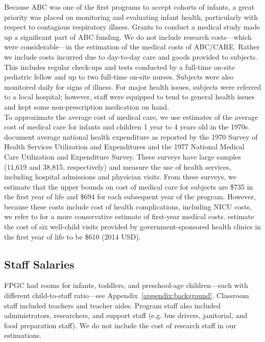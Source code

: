 \noindent Because ABC was one of the first programs to accept cohorts of infants, a great priority was placed on monitoring and evaluating infant health, particularly with respect to contagious respiratory illness. Grants to conduct a medical study made up a significant part of ABC funding. We do not include research costs---which were considerable---in the estimation of the medical costs of ABC/CARE. Rather we include costs incurred due to day-to-day care and goods provided to subjects. This includes regular check-ups and tests conducted  by a full-time on-site pediatric fellow and up to two full-time on-site nurses. Subjects were also monitored daily for signs of illness. For major health issues, subjects were referred to a local hospital; however, staff were equipped to tend to general health issues and kept some non-prescription medication on hand. \\

\noindent To approximate the average cost of medical care, we use  estimates of the average cost of medical care for infants and children 1 year to 4 years old in the 1970s. \cite{Cutler_Meara_1998_Med-Costs_BOOK} document average national health expenditure as reported by  the 1970 Survey of Health Services  Utilization  and Expenditures and the 1977 National Medical Care Utilization  and Expenditure Survey. These surveys have large samples (11,619 and 38,815, respectively) and measure the use of health services, including hospital admissions and physician visits. From these surveys, we estimate that the upper bounds on cost of medical care for subjects are \$735 in the first year of life and \$694 for each subsequent year of the program. However, because these costs include cost of health complications, including NICU costs, we refer to \cite{Robinson_etal_1974_FPP} for a more conservative estimate of first-year medical costs. \cite{Robinson_etal_1974_FPP} estimate the cost of six well-child visits provided by government-sponsored health clinics in the first year of life to be \$610 (2014 USD). \\

\subsection{Staff Salaries}
\noindent FPGC had rooms for infants, toddlers, and preschool-age children---each with different child-to-staff ratio---see Appendix~\ref{appendix:background}. Classroom staff included teachers and teacher aides. Program staff also included administrators, researchers, and support staff (e.g. bus drivers, janitorial, and food preparation staff). We do not include the cost of research staff in our estimations. \\

